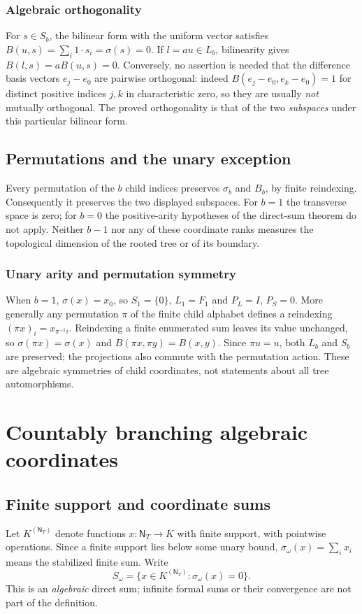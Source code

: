 \documentclass[11pt,reqno]{amsart}
\theoremstyle{definition}\newtheorem{definition}[theorem]{Definition}
\theoremstyle{remark}\newtheorem{remark}[theorem]{Remark}
\newcommand{\N}{\mathsf N_T}\newcommand{\Z}{\mathsf Z_T}\newcommand{\Q}{\mathsf Q_T}\newcommand{\RR}{\mathsf R}
\begin{document}
\medskip
\subsubsection*{Algebraic orthogonality}\label{supp:8-4}
For $s\in S_b$, the bilinear form with the uniform vector satisfies $B(u,s)=\sum_i 1\cdot s_i=\sigma(s)=0$. If $l=au\in L_b$, bilinearity gives $B(l,s)=aB(u,s)=0$. Conversely, no assertion is needed that the difference basis vectors $e_j-e_0$ are pairwise orthogonal: indeed $B(e_j-e_0,e_k-e_0)=1$ for distinct positive indices $j,k$ in characteristic zero, so they are usually \emph{not} mutually orthogonal. The proved orthogonality is that of the two \emph{subspaces} under this particular bilinear form.
\medskip

\subsection{Permutations and the unary exception}\label{main:sub-27}
Every permutation of the $b$ child indices preserves $\sigma_b$ and $B_b$, by finite reindexing. Consequently it preserves the two displayed subspaces. For $b=1$ the transverse space is zero; for $b=0$ the positive-arity hypotheses of the direct-sum theorem do not apply. Neither $b-1$ nor any of these coordinate ranks measures the topological dimension of the rooted tree or of its boundary.


\medskip
\subsubsection*{Unary arity and permutation symmetry}\label{supp:8-8}
When $b=1$, $\sigma(x)=x_0$, so $S_1=\{0\}$, $L_1=F_1$ and $P_L=I$, $P_S=0$. More generally any permutation $\pi$ of the finite child alphabet defines a reindexing $(\pi x)_i=x_{\pi^{-1}i}$. Reindexing a finite enumerated sum leaves its value unchanged, so $\sigma(\pi x)=\sigma(x)$ and $B(\pi x,\pi y)=B(x,y)$. Since $\pi u=u$, both $L_b$ and $S_b$ are preserved; the projections also commute with the permutation action. These are algebraic symmetries of child coordinates, not statements about all tree automorphisms.
\medskip

\clearpage
\section{Countably branching algebraic coordinates}\label{sec:omega}
\subsection{Finite support and coordinate sums}\label{main:sub-28}
Let $K^{(\N)}$ denote functions $x:\N\to K$ with finite support, with pointwise operations. Since a finite support lies below some unary bound, $\sigma_\omega(x)=\sum_i x_i$ means the stabilized finite sum. Write
\[
S_\omega=\{x\in K^{(\N)}:\sigma_\omega(x)=0\}.
\]
This is an \emph{algebraic} direct sum; infinite formal sums or their convergence are not part of the definition.
\end{document}
